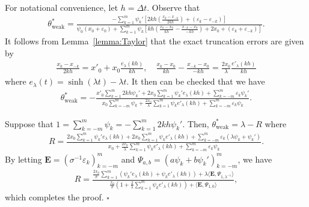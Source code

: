\documentclass[final]{siamltex}
\begin{document}
\begin{appendices}
For notational convenience, let $h = \Delta t$.
    Observe that 
    \begin{align*}
        \theta^*_\text{weak} = \frac{- \sum_{k=1}^{m} \psi_k' \left[2kh \left( \frac{x_k- x_{-k}}{2kh} \right) + (\varepsilon_k - \varepsilon_{-k})\right]}{\psi_0(x_0 + \varepsilon_0) + \sum_{k=1}^{m} \psi_k \left[kh \left( \frac{x_k -x_0}{kh} - \frac{x_{-k}-x_0}{-kh} \right) + 2x_0 + (\varepsilon_k + \varepsilon_{-k})\right]}.
    \end{align*}
    It follows from Lemma~\ref{lemma:Taylor} that 
    the exact truncation errors are given by 
    \begin{align*}
        \frac{x_k - x_{-k}}{2kh} = x'_0 + x_0\frac{e_\lambda(kh)}{kh}, \quad 
        \frac{x_k -x_0}{kh} - \frac{x_{-k}-x_0}{-kh} = \frac{2x_0}{\lambda}\frac{e'_\lambda(kh)}{kh}
    \end{align*}
    where $e_\lambda(t) = \sinh(\lambda t) - \lambda t$.
    It then can be checked that we have
    \begin{align*}
        \theta^*_\text{weak} = 
        -\frac{x'_0 \sum_{k=1}^{m} 2kh \psi_k' + 2x_0\sum_{k=1}^m \psi_k' e_\lambda(kh)+ \sum_{k=-m}^m \varepsilon_k\psi_k'}{x_0\sum_{k=-m}^m\psi_k + \frac{2x_0}{\lambda}\sum_{k=1}^{m} \psi_k e'_\lambda(kh) + \sum_{k=-m}^m \varepsilon_k\psi_k}.
    \end{align*}
    
    Suppose that $1 = \sum_{k=-m}^m \psi_k = -\sum_{k=1}^m 2kh\psi_k'$.
    Then, $\theta^*_\text{weak} = \lambda - R$ where 
    \begin{align*}
        R = \frac{2x_0\sum_{k=1}^m \psi_k'e_\lambda(kh) + 2x_0\sum_{k=1}^{m} \psi_k e'_\lambda(kh) +\sum_{k=-m}^m\varepsilon_k(\lambda \psi_k + \psi_k')
        }{x_0  + \frac{2x_0}{\lambda}\sum_{k=1}^{m} \psi_k e'_\lambda(kh)+ \sum_{k=-m}^m \varepsilon_k\psi_k}.
    \end{align*}
    By letting $\bm{E} = (\sigma^{-1}\varepsilon_k)_{k=-m}^m$
    and $\Psi_{a,b} = (a\psi_k + b\psi_k')_{k=-m}^m$, we have
    \begin{align*}
        R = \frac{\frac{2x_0}{\sigma} \sum_{k=1}^m (\psi_k' e_\lambda(kh) + \psi_k e'_\lambda(kh)) 
        + \lambda \langle \bm{E}, \Psi_{1,\lambda^{-1}}\rangle
        }{\frac{x_0}{\sigma}(1 + \frac{2}{\lambda}\sum_{k=1}^{m} \psi_ke'_\lambda(kh))+ \langle \bm{E}, \Psi_{1, 0}\rangle},
    \end{align*}
    which completes the proof.  \hfill $\square$


\end{appendices}
\end{document}
